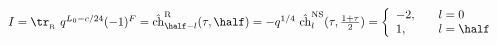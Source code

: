 \begin{equation}
  \begin{array}{l}
  I= \tr_{_{\rm R}} ~q^{L_0-c/24} (-1)^F = \hat{\rm ch}^{\rm R}_{\half-l}
  (\tau,\half) = -q^{1/4} ~\hat{\rm ch}^{\rm NS}_l(\tau,{1+\tau\over 2}) = \left\{ 
  \begin{array}{ll}
-2, \quad &l=0\\
1, \quad &l=\half
  \end{array} \right.
  \end{array}
\end{equation}

